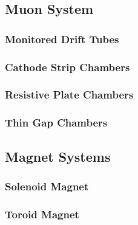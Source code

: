 	\subsection{Muon System}{

	}

		\subsubsection{Monitored Drift Tubes}{

		}

		\subsubsection{Cathode Strip Chambers}{

		}

		\subsubsection{Resistive Plate Chambers}{

		}

		\subsubsection{Thin Gap Chambers}{

		}

	\subsection{Magnet Systems}{

	}

		\subsubsection{Solenoid Magnet}{

		}

		\subsubsection{Toroid Magnet}{
		
		}

		